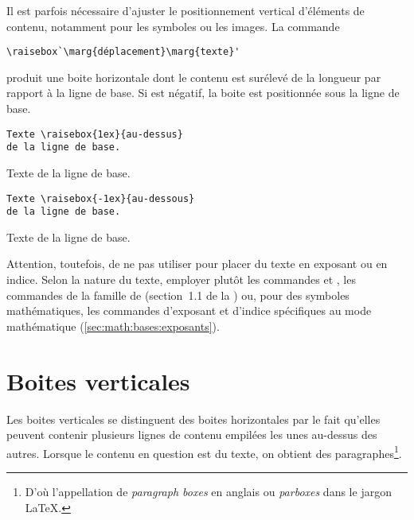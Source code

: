 Il est parfois nécessaire d'ajuster le positionnement vertical
d'éléments de contenu, notamment pour les symboles ou les images. La
commande
\begin{lstlisting}
\raisebox`\marg{déplacement}\marg{texte}'
\end{lstlisting}
produit une boite horizontale dont le contenu  est
surélevé de la longueur  par rapport à la ligne de
base. Si  est négatif, la boite est positionnée sous
la ligne de base.
\begin{demo}
  \begin{texample}[0.55\textwidth]
\begin{lstlisting}
Texte \raisebox{1ex}{au-dessus}
de la ligne de base.
\end{lstlisting}
    \producing
    Texte \raisebox{1ex}{au-dessus}
    de la ligne de base.
  \end{texample}

  \begin{texample}[0.55\textwidth]
\begin{lstlisting}
Texte \raisebox{-1ex}{au-dessous}
de la ligne de base.
\end{lstlisting}
    \producing
    Texte \raisebox{-1ex}{au-dessous}
    de la ligne de base.
  \end{texample}
\end{demo}

Attention, toutefois, de ne pas utiliser \cmd{\raisebox} pour placer
du texte en exposant ou en indice. Selon la nature du texte, employer
plutôt les commandes \cmd{\textsuperscript} et \cmd{\textsubscript},
les commandes de la famille \cmd{\ieme} de  (section~1.1 de
la %
) ou, pour des
symboles mathématiques, les commandes d'exposant et d'indice
spécifiques au mode mathématique (\autoref{sec:math:bases:exposants}).

\section{Boites verticales}
\label{sec:boites:parbox}

Les boites verticales se distinguent des boites horizontales par le
fait qu'elles peuvent contenir plusieurs lignes de contenu empilées
les unes au-dessus des autres. Lorsque le contenu en question est du
texte, on obtient des paragraphes\footnote{%
  D'où l'appellation de \emph{paragraph boxes} en anglais
  ou \emph{parboxes} dans le jargon {\LaTeX}.}. %

